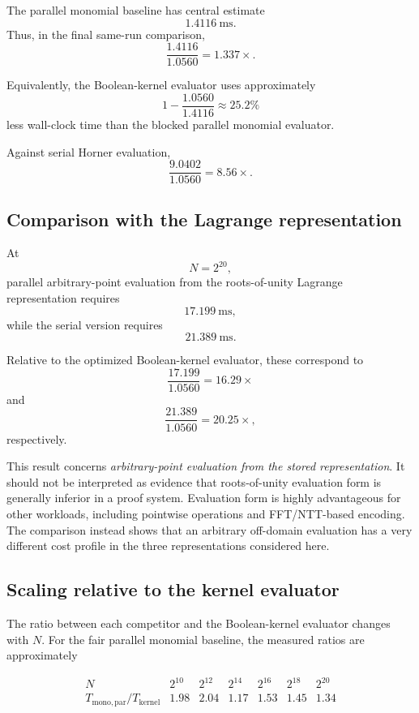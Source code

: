 The parallel monomial baseline has central estimate
\[
1.4116\ \mathrm{ms}.
\]
Thus, in the final same-run comparison,
\[
\frac{1.4116}{1.0560}
=
\boxed{1.337\times}.
\]

Equivalently, the Boolean-kernel evaluator uses approximately
\[
1-\frac{1.0560}{1.4116}
\approx
\boxed{25.2\%}
\]
less wall-clock time than the blocked parallel monomial evaluator.

Against serial Horner evaluation,
\[
\frac{9.0402}{1.0560}
=
\boxed{8.56\times}.
\]

\subsection{Comparison with the Lagrange representation}

At
\[
N=2^{20},
\]
parallel arbitrary-point evaluation from the roots-of-unity Lagrange
representation requires
\[
17.199\ \mathrm{ms},
\]
while the serial version requires
\[
21.389\ \mathrm{ms}.
\]

Relative to the optimized Boolean-kernel evaluator, these correspond to
\[
\frac{17.199}{1.0560}
=
\boxed{16.29\times}
\]
and
\[
\frac{21.389}{1.0560}
=
\boxed{20.25\times},
\]
respectively.

This result concerns \emph{arbitrary-point evaluation from the stored
representation}.  It should not be interpreted as evidence that
roots-of-unity evaluation form is generally inferior in a proof system.
Evaluation form is highly advantageous for other workloads, including
pointwise operations and FFT/NTT-based encoding.  The comparison instead
shows that an arbitrary off-domain evaluation has a very different cost
profile in the three representations considered here.

\subsection{Scaling relative to the kernel evaluator}

The ratio between each competitor and the Boolean-kernel evaluator changes
with \(N\).  For the fair parallel monomial baseline, the measured ratios
are approximately

\[
\begin{array}{c|cccccc}
N &
2^{10} &
2^{12} &
2^{14} &
2^{16} &
2^{18} &
2^{20}
\\
\hline
T_{\mathrm{mono,par}}/T_{\mathrm{kernel}}
&
1.98 &
2.04 &
1.17 &
1.53 &
1.45 &
1.34
\end{array}
\]

